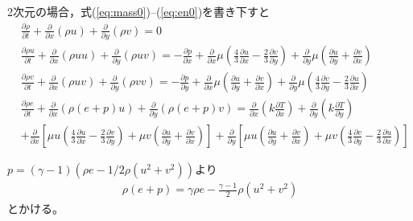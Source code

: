\documentclass[a4paper,10pt,fleqn,dvipdfmx]{jsarticle}
\begin{document}
2次元の場合，式(\ref{eq:mass0})--(\ref{eq:en0})を書き下すと
\begin{align}
& \frac{\partial \rho}{\partial t} + \frac{\partial}{\partial x}(\rho
 u) + \frac{\partial}{\partial y}(\rho  v) = 0 \label{eq:mass1}\\
%
& \frac{\partial \rho u}{\partial t} + \frac{\partial}{\partial x}(\rho
 u u) + \frac{\partial}{\partial y}(\rho
 u v) = -\frac{\partial p}{\partial x} + \frac{\partial
 }{\partial x} \mu \left(\frac{4}{3}\frac{\partial u}{\partial x} -
 \frac{2}{3}\frac{\partial v}{\partial y}\right) +  \frac{\partial
 }{\partial y} \mu \left(\frac{\partial u}{\partial y} +
 \frac{\partial v}{\partial x}\right) \label{eq:mom1x}\\
%
& \frac{\partial \rho v}{\partial t} + \frac{\partial}{\partial x}(\rho
 u v) + \frac{\partial}{\partial y}(\rho
 v v) = -\frac{\partial p}{\partial y} + \frac{\partial
 }{\partial x}  \mu \left(\frac{\partial u}{\partial y} +
 \frac{\partial v}{\partial x}\right) +  \frac{\partial
 }{\partial y} \mu\left(\frac{4}{3}\frac{\partial v}{\partial y} -
 \frac{2}{3}\frac{\partial u}{\partial x}\right) \label{eq:mom1y}\\
%
& \frac{\partial \rho e}{\partial t} + \frac{\partial}{\partial x}(\rho
 (e+p)u) + \frac{\partial}{\partial y}(\rho
  (e+p)v) 
= \frac{\partial}{\partial x}\left(k\frac{\partial T}{\partial
 x}\right) 
+ \frac{\partial}{\partial y}\left(k\frac{\partial T}{\partial
 y}\right) \nonumber \\
& +  \frac{\partial
 }{\partial x} \left[ \mu u \left(\frac{4}{3}\frac{\partial u}{\partial x} -
 \frac{2}{3}\frac{\partial v}{\partial y}\right) + \mu v\left( \frac{\partial u}{\partial y} +
 \frac{\partial v}{\partial x}\right)
 \right] 
+ \frac{\partial}{\partial y}\left[  \mu u \left(\frac{\partial u}{\partial y} +
 \frac{\partial v}{\partial x}\right) +  \mu v\left(\frac{4}{3}\frac{\partial v}{\partial y} -
 \frac{2}{3}\frac{\partial u}{\partial x}\right)\right] \label{eq:en1}
\end{align}

$p=(\gamma-1)(\rho e - 1/2\rho(u^2+v^2))$より
\begin{align}
 \rho(e+p)=\gamma \rho e-
\frac{\gamma-1}{2}\rho(u^2+v^2)
\end{align}
とかける。
\end{document}
